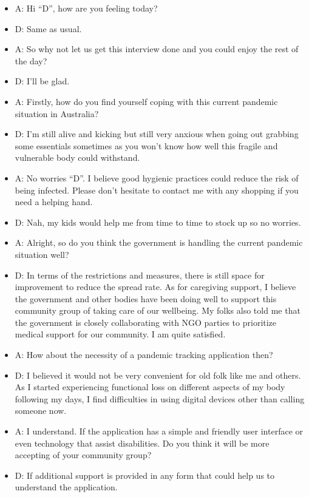 \begin{appendices}
      \begin{itemize}
        \item A: Hi “D”, how are you feeling today?
        \item D: Same as usual.
        \item A: So why not let us get this interview done and you could enjoy the rest of the day?
        \item D: I’ll be glad.
        \item A: Firstly, how do you find yourself coping with this current pandemic situation in Australia?
        \item D: I’m still alive and kicking but still very anxious when going out grabbing some essentials
        sometimes as you won’t know how well this fragile and vulnerable body could withstand.
        \item A: No worries “D”. I believe good hygienic practices could reduce the risk of being infected.
        Please don’t hesitate to contact me with any shopping if you need a helping hand.
        \item D: Nah, my kids would help me from time to time to stock up so no worries.
        \item A: Alright, so do you think the government is handling the current pandemic situation well?
        \item D: In terms of the restrictions and measures, there is still space for improvement to reduce the
        spread rate. As for caregiving support, I believe the government and other bodies have been
        doing well to support this community group of taking care of our wellbeing. My folks also
        told me that the government is closely collaborating with NGO parties to prioritize medical
        support for our community. I am quite satisfied.
        \item A: How about the necessity of a pandemic tracking application then?
        \item D: I believed it would not be very convenient for old folk like me and others. As I started
        experiencing functional loss on different aspects of my body following my days, I find
        difficulties in using digital devices other than calling someone now.
        \item A: I understand. If the application has a simple and friendly user interface or even technology
        that assist disabilities. Do you think it will be more accepting of your community group?
        \item D: If additional support is provided in any form that could help us to understand the application.

\end{itemize}
\end{appendices}
